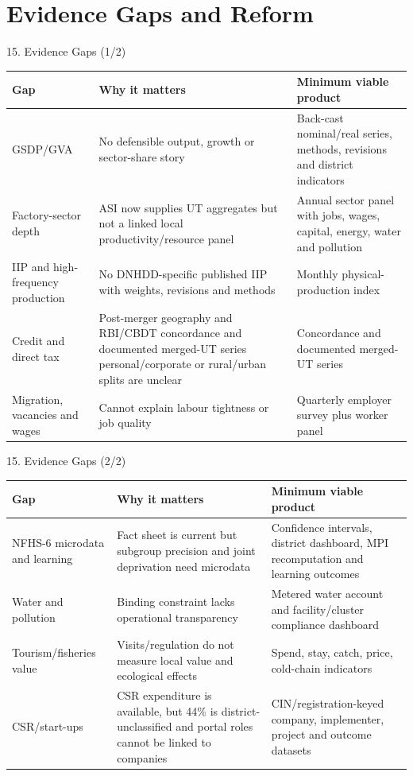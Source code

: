 \documentclass[aspectratio=169,11pt]{beamer}
\renewcommand{\arraystretch}{1.12}
\begin{document}
\section{Evidence Gaps and Reform}
\begin{frame}{15. Evidence Gaps (1/2)}\tiny\setlength{\tabcolsep}{2pt}\renewcommand{\arraystretch}{1.1}
\begin{tabularx}{\textwidth}{p{}p{}Y}\toprule Gap & Why it matters & Minimum viable product\\\midrule
GSDP/GVA & No defensible output, growth or sector-share story & Back-cast nominal/real series, methods, revisions and district indicators\\
Factory-sector depth & ASI now supplies UT aggregates but not a linked local productivity/resource panel & Annual sector panel with jobs, wages, capital, energy, water and pollution\\
IIP and high-frequency production & No DNHDD-specific published IIP with weights, revisions and methods & Monthly physical-production index\\
Credit and direct tax & Post-merger geography and RBI/CBDT concordance and documented merged-UT series personal/corporate or rural/urban splits are unclear & Concordance and documented merged-UT series\\
Migration, vacancies and wages & Cannot explain labour tightness or job quality & Quarterly employer survey plus worker panel\\
\bottomrule\end{tabularx}
\end{frame}

\begin{frame}{15. Evidence Gaps (2/2)}\tiny\setlength{\tabcolsep}{2pt}\renewcommand{\arraystretch}{1.1}
\begin{tabularx}{\textwidth}{p{}p{}Y}\toprule Gap & Why it matters & Minimum viable product\\\midrule
NFHS-6 microdata and learning & Fact sheet is current but subgroup precision and joint deprivation need microdata & Confidence intervals, district dashboard, MPI recomputation and learning outcomes\\
Water and pollution & Binding constraint lacks operational transparency & Metered water account and facility/cluster compliance dashboard\\
Tourism/fisheries value & Visits/regulation do not measure local value and ecological effects & Spend, stay, catch, price, cold-chain indicators\\
CSR/start-ups & CSR expenditure is available, but 44\% is district-unclassified and portal roles cannot be linked to companies & CIN/registration-keyed company, implementer, project and outcome datasets\\
\bottomrule\end{tabularx}
\end{frame}
\end{document}
